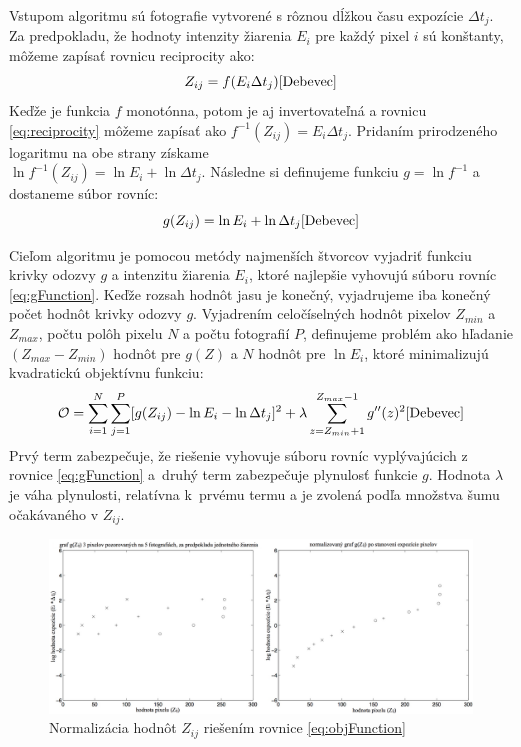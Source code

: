 Vstupom algoritmu sú fotografie vytvorené s rôznou dĺžkou času expozície $\Delta t_{j}$. Za predpokladu, 
že hodnoty intenzity žiarenia $E_{i}$ pre každý pixel $i$ sú konštanty, môžeme zapísať rovnicu 
reciprocity ako:
\begin{equation} \label{eq:reciprocity}
    Z_{ij} = f(E_{i} \Delta t_{j})
    \cite{Debevec}
\end{equation}
Keďže je funkcia $f$ monotónna, potom je aj invertovateľná a rovnicu \ref{eq:reciprocity} môžeme
zapísať ako $f^{-1}(Z_{ij}) = E_{i} \Delta t_{j}$. Pridaním prirodzeného logaritmu na obe strany 
získame \\$\ln f^{-1}(Z_{ij}) = \ln E_{i} + \ln \Delta t_{j}$. Následne si definujeme funkciu
$g = \ln f^{-1}$ a dostaneme súbor rovníc:
\begin{equation} \label{eq:gFunction}
    g(Z_{ij}) = \ln E_{i} + \ln \Delta t_{j}
    \cite{Debevec}
\end{equation}

Cieľom algoritmu je pomocou metódy najmenších štvorcov vyjadriť funkciu krivky odozvy $g$ a intenzitu
žiarenia $E_{i}$, ktoré najlepšie vyhovujú súboru rovníc \ref{eq:gFunction}. Keďže rozsah hodnôt jasu
je konečný, vyjadrujeme iba konečný počet hodnôt krivky odozvy $g$. Vyjadrením celočíselných hodnôt
pixelov $Z_{min}$ a $Z_{max}$, počtu polôh pixelu $N$ a počtu fotografií $P$, definujeme problém ako
hľadanie $(Z_{max} - Z_{min})$ hodnôt pre $g(Z)$ a $N$ hodnôt pre $\ln E_{i}$, ktoré minimalizujú
kvadratickú objektívnu funkciu:
\begin{equation} \label{eq:objFunction}
    \mathcal{O} = 
    \sum_{i=1}^{N}
    \sum_{j=1}^{P}
    [g(Z_{ij}) - \ln E_{i} - \ln \Delta t_{j}]^{2}
    + \lambda
    \sum_{z=Z_{min} + 1}^{Z_{max} - 1}
    g''(z)^{2}
    \cite{Debevec}
\end{equation}
Prvý term zabezpečuje, že riešenie vyhovuje súboru rovníc vyplývajúcich z rovnice \ref{eq:gFunction}
a~druhý term zabezpečuje plynulosť funkcie $g$. Hodnota $\lambda$ je váha plynulosti, relatívna 
k~prvému termu a je zvolená podľa množstva šumu očakávaného v $Z_{ij}$.

\begin{figure}[t]
    \centering
    \includegraphics[width=\textwidth]{figures/generating/normalized-curve}
    \caption{Normalizácia hodnôt $Z_{ij}$ riešením rovnice \ref{eq:objFunction} \cite{Debevec}}
\end{figure}
